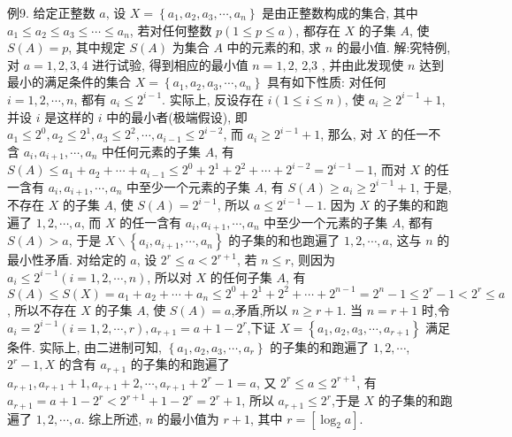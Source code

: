 例9. 给定正整数 $a$, 设 $X=\left\{a_1, a_2, a_3, \cdots, a_n\right\}$ 是由正整数构成的集合, 其中 $a_1 \leqslant a_2 \leqslant a_3 \leqslant \cdots \leqslant a_n$, 若对任何整数 $p(1 \leqslant p \leqslant a)$, 都存在 $X$ 的子集 $A$, 使 $S(A)=p$, 其中规定 $S(A)$ 为集合 $A$ 中的元素的和, 求 $n$ 的最小值.
解:究特例, 对 $a=1,2,3,4$ 进行试验, 得到相应的最小值 $n=1,2$, 2,3 , 并由此发现使 $n$ 达到最小的满足条件的集合 $X=\left\{a_1, a_2, a_3, \cdots, a_n\right\}$ 具有如下性质: 对任何 $i=1,2, \cdots, n$, 都有 $a_i \leqslant 2^{i-1}$.
实际上, 反设存在 $i(1 \leqslant i \leqslant n)$, 使 $a_i \geqslant 2^{i-1}+1$, 并设 $i$ 是这样的 $i$ 中的最小者(极端假设), 即 $a_1 \leqslant 2^0, a_2 \leqslant 2^1, a_3 \leqslant 2^2, \cdots, a_{i-1} \leqslant 2^{i-2}$, 而 $a_i \geqslant 2^{i-1}+1$, 那么, 对 $X$ 的任一不含 $a_i, a_{i+1}, \cdots, a_n$ 中任何元素的子集 $A$, 有 $S(A) \leqslant a_1+a_2+\cdots+a_{i-1} \leqslant 2^0+2^1+2^2+\cdots+2^{i-2}=2^{i-1}-1$, 而对 $X$ 的任一含有 $a_i, a_{i+1}, \cdots, a_n$ 中至少一个元素的子集 $A$, 有 $S(A) \geqslant a_i \geqslant 2^{i-1}+1$, 于是, 不存在 $X$ 的子集 $A$, 使 $S(A)=2^{i-1}$, 所以 $a \leqslant 2^{i-1}-1$.
因为 $X$ 的子集的和跑遍了 $1,2, \cdots, a$, 而 $X$ 的任一含有 $a_i, a_{i+1}, \cdots, a_n$ 中至少一个元素的子集 $A$, 都有 $S(A)>a$, 于是 $X \backslash\left\{a_i, a_{i+1}, \cdots, a_n\right\}$ 的子集的和也跑遍了 $1,2, \cdots, a$, 这与 $n$ 的最小性矛盾.
对给定的 $a$, 设 $2^r \leqslant a<2^{r+1}$, 若 $n \leqslant r$, 则因为 $a_i \leqslant 2^{i-1}(i=1,2, \cdots, n)$, 所以对 $X$ 的任何子集 $A$, 有 $S(A) \leqslant S(X)=a_1+a_2+\cdots+a_n \leqslant 2^0+2^1+ 2^2+\cdots+2^{n-1}=2^n-1 \leqslant 2^r-1<2^r \leqslant a$, 所以不存在 $X$ 的子集 $A$, 使 $S(A)=a$,矛盾,所以 $n \geqslant r+1$.
当 $n=r+1$ 时,令 $a_i=2^{i-1}(i=1,2, \cdots, r), a_{r+1}=a+1-2^r$,下证 $X=\left\{a_1, a_2, a_3, \cdots, a_{r+1}\right\}$ 满足条件.
实际上, 由二进制可知, $\left\{a_1, a_2, a_3, \cdots, a_r\right\}$ 的子集的和跑遍了 $1,2, \cdots$, $2^r-1, X$ 的含有 $a_{r+1}$ 的子集的和跑遍了 $a_{r+1}, a_{r+1}+1, a_{r+1}+2, \cdots, a_{r+1}+ 2^r-1=a$, 又 $2^r \leqslant a \leqslant 2^{r+1}$, 有 $a_{r+1}=a+1-2^r<2^{r+1}+1-2^r=2^r+1$, 所以 $a_{r+1} \leqslant 2^r$,于是 $X$ 的子集的和跑遍了 $1,2, \cdots, a$.
综上所述, $n$ 的最小值为 $r+1$, 其中 $r=\left[\log _2 a\right]$.


